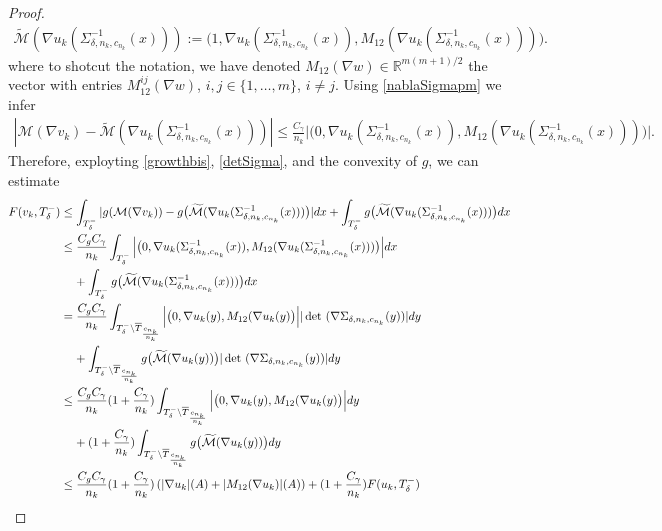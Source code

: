 \documentclass[a4paper,11pt]{article}
\numberwithin{equation}{section}
\def\det{\,{\rm det\ }}
\newcommand{\R}{\mathbb{R}}
\begin{document}
\begin{proof}
\begin{align}
\widetilde {\mathcal M}(\nabla u_k(\Sigma_{\delta,n_k,c_{n_k}}^{-1}(x))):=\big(1,\nabla u_k(\Sigma_{\delta,n_k,c_{n_k}}^{-1}(x)),M_{12}(\nabla u_k(\Sigma^{-1}_{\delta,n_k,c_{n_k}}(x)))\big).
\end{align}
where to shotcut the notation, we have denoted $M_{12}(\nabla w)\in \R^{m(m+1)/2}$ the vector with entries $M^{ij}_{12}(\nabla w)$, $i,j\in \{1,\dots,m\}$, $i\neq j$.  
Using \eqref{nablaSigmapm} we infer
\begin{align*}
|\mathcal M(\nabla v_k)-\widetilde {\mathcal M}(\nabla u_k(\Sigma_{\delta,n_k,c_{n_k}}^{-1}(x)))|\leq \frac{C_\gamma}{n_k}\Big|\big(0,\nabla u_k(\Sigma_{\delta,n_k,c_{n_k}}^{-1}(x)),M_{12}(\nabla u_k(\Sigma^{-1}_{\delta,n_k,c_{n_k}}(x)))\big)\Big|.
\end{align*} 
Therefore, exployting \eqref{growthbis}, \eqref{detSigma}, and the convexity of $g$, we can estimate
\begin{align*}
	F(v_k,T_\delta^-)&\leq \int_{T_\delta^-}|g(\mathcal M(\nabla v_k))-g\big(\widetilde {\mathcal M}(\nabla u_k(\Sigma_{\delta,n_k,c_{n_k}}^{-1}(x)))\big)|dx+ \int_{T_\delta^-}g\big(\widetilde {\mathcal M}(\nabla u_k(\Sigma_{\delta,n_k,c_{n_k}}^{-1}(x)))\big)dx\\
	&\leq \frac{C_gC_\gamma}{n_k}\int_{T_\delta^-}\Big|\big(0,\nabla u_k(\Sigma_{\delta,n_k,c_{n_k}}^{-1}(x)),M_{12}(\nabla u_k(\Sigma^{-1}_{\delta,n_k,c_{n_k}}(x)))\big)\Big|dx\\
	&\;\;\;\;+\int_{T_\delta^-}g\big(\widetilde {\mathcal M}(\nabla u_k(\Sigma_{\delta,n_k,c_{n_k}}^{-1}(x)))\big)dx\\
	&=\frac{C_gC_\gamma}{n_k}\int_{T_\delta^-\setminus \overline T_{\frac{c_{n_k}}{n_k}}}\Big|\big(0,\nabla u_k(y),M_{12}(\nabla u_k(y)\big)\Big||\det(\nabla \Sigma_{\delta,n_k,c_{n_k}}(y))|dy\\	&\;\;\;\;+\int_{T_\delta^-\setminus \overline T_{\frac{c_{n_k}}{n_k}}}g\big(\widetilde {\mathcal M}(\nabla u_k(y))\big)|\det(\nabla \Sigma_{\delta,n_k,c_{n_k}}(y))|dy\\
	&\leq \frac{C_gC_\gamma}{n_k}(1+\frac{C_\gamma}{n_k})\int_{T_\delta^-\setminus \overline T_{\frac{c_{n_k}}{n_k}}}\Big|\big(0,\nabla u_k(y),M_{12}(\nabla u_k(y)\big)\Big|dy\\	&\;\;\;\;+(1+\frac{C_\gamma}{n_k})\int_{T_\delta^-\setminus \overline T_{\frac{c_{n_k}}{n_k}}}g\big(\widetilde {\mathcal M}(\nabla u_k(y))\big)dy\\
	&\leq \frac{C_gC_\gamma}{n_k}(1+\frac{C_\gamma}{n_k})\left(|\nabla u_k|(A)+|M_{12}(\nabla u_k)|(A)\right)+(1+\frac{C_\gamma}{n_k})F(u_k,T_\delta^-)

\end{align*}
\end{proof}
\end{document}

